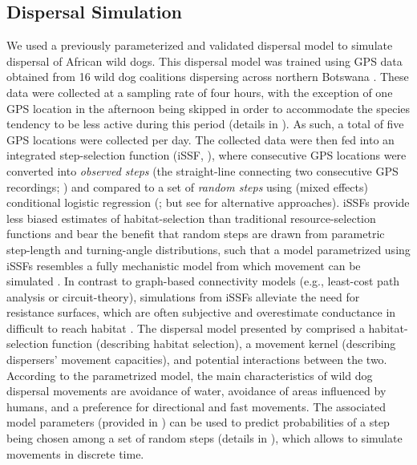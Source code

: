 \documentclass[../FinalThesis.tex]{subfiles}
\begin{document}
\subsection{Dispersal Simulation}

We used a previously parameterized and validated dispersal model to simulate
dispersal of African wild dogs. This dispersal model was trained using GPS data
obtained from 16 wild dog coalitions dispersing across northern Botswana
\citep{Hofmann.2023}. These data were collected at a sampling rate of four
hours, with the exception of one GPS location in the afternoon being skipped in
order to accommodate the species tendency to be less active during this period
(details in \citealp{Cozzi.2020, Hofmann.2021}). As such, a total of five GPS
locations were collected per day. The collected data were then fed into an
integrated step-selection function (iSSF, \citealp{Avgar.2016}), where
consecutive GPS locations were converted into \textit{observed steps} (the
straight-line connecting two consecutive GPS recordings; \citealp{Turchin.1998})
and compared to a set of \textit{random steps} using (mixed effects) conditional
logistic regression (\citealp{Fortin.2005, Thurfjell.2014, Muff.2020,
Fieberg.2021}; but see \citealp{Michelot.2024} for alternative approaches).
iSSFs provide less biased estimates of habitat-selection than traditional
resource-selection functions \citep{Forester.2009, Zeller.2016} and bear the
benefit that random steps are drawn from parametric step-length and
turning-angle distributions, such that a model parametrized using iSSFs
resembles a fully mechanistic model from which movement can be simulated
\citep{Signer.2017, Potts.2023, Signer.2024}. In contrast to graph-based
connectivity models (e.g., least-cost path analysis or circuit-theory),
simulations from iSSFs alleviate the need for resistance surfaces, which are
often subjective \citep{Simpkins.2017, Marrec.2020} and overestimate conductance
in difficult to reach habitat \citep{Signer.2017, Hofmann.2023}. The dispersal
model presented by \citet{Hofmann.2023} comprised a habitat-selection function
(describing habitat selection), a movement kernel (describing dispersers'
movement capacities), and potential interactions between the two. According to
the parametrized model, the main characteristics of wild dog dispersal movements
are avoidance of water, avoidance of areas influenced by humans, and a
preference for directional and fast movements. The associated model parameters
(provided in ) can be used to predict probabilities of a step being
chosen among a set of random steps (details in ), which
allows to simulate movements in discrete time.
\end{document}
